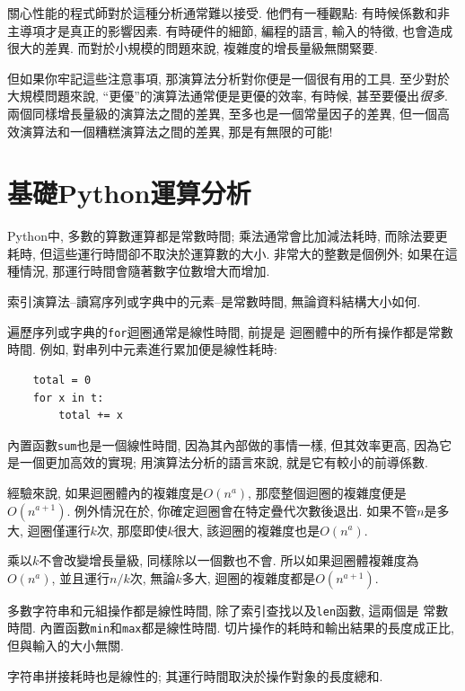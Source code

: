 \documentclass[10pt]{book}
\begin{document}
關心性能的程式師對於這種分析通常難以接受.
他們有一種觀點: 有時候係數和非主導項才是真正的影響因素. 
有時硬件的細節, 編程的語言, 輸入的特徵, 也會造成很大的差異. 
而對於小規模的問題來說, 複雜度的增長量級無關緊要. 

但如果你牢記這些注意事項, 那演算法分析對你便是一個很有用的工具. 
至少對於大規模問題來說, ``更優''的演算法通常便是更優的效率, 有時候, 
甚至要優出{\em 很多}. 
兩個同樣增長量級的演算法之間的差異, 至多也是一個常量因子的差異, 
但一個高效演算法和一個糟糕演算法之間的差異, 那是有無限的可能!


\section{基礎Python運算分析}

Python中, 多數的算數運算都是常數時間;
乘法通常會比加減法耗時, 而除法要更耗時, 
但這些運行時間卻不取決於運算數的大小. 
非常大的整數是個例外; 如果在這種情況, 那運行時間會隨著數字位數增大而增加. 

索引演算法--讀寫序列或字典中的元素--是常數時間, 無論資料結構大小如何. 

遍歷序列或字典的{\tt for}迴圈通常是線性時間, 前提是
迴圈體中的所有操作都是常數時間. 
例如, 對串列中元素進行累加便是線性耗時:

\begin{verbatim}
    total = 0
    for x in t:
        total += x
\end{verbatim}

內置函數{\tt sum}也是一個線性時間, 因為其內部做的事情一樣, 
但其效率更高, 因為它是一個更加高效的實現; 用演算法分析的語言來說, 
就是它有較小的前導係數.

經驗來說, 如果迴圈體內的複雜度是$O(n^a)$, 那麼整個迴圈的複雜度便是
$O(n^{a+1})$. 
例外情況在於, 你確定迴圈會在特定疊代次數後退出. 
如果不管$n$是多大, 迴圈僅運行$k$次, 
那麼即使$k$很大, 該迴圈的複雜度也是$O(n^a)$.

乘以$k$不會改變增長量級, 同樣除以一個數也不會. 
所以如果迴圈體複雜度為 $O(n^a)$, 並且運行$n/k$次, 無論$k$多大, 
迴圈的複雜度都是$O(n^{a+1})$. 

多數字符串和元組操作都是線性時間, 除了索引查找以及{\tt len}函數, 這兩個是
常數時間. 內置函數{\tt min}和{\tt max}都是線性時間. 
切片操作的耗時和輸出結果的長度成正比, 但與輸入的大小無關. 

字符串拼接耗時也是線性的; 其運行時間取決於操作對象的長度總和. 
\end{document}
